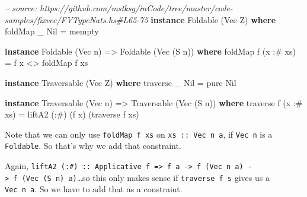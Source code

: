\documentclass[]{article}
\newenvironment{Shaded}{}{}
\newcommand{\KeywordTok}[1]{\textcolor[rgb]{0.00,0.44,0.13}{\textbf{{#1}}}}
\newcommand{\DataTypeTok}[1]{\textcolor[rgb]{0.56,0.13,0.00}{{#1}}}
\newcommand{\CommentTok}[1]{\textcolor[rgb]{0.38,0.63,0.69}{\textit{{#1}}}}
\newcommand{\OtherTok}[1]{\textcolor[rgb]{0.00,0.44,0.13}{{#1}}}
\newcommand{\FunctionTok}[1]{\textcolor[rgb]{0.02,0.16,0.49}{{#1}}}
\newcommand{\NormalTok}[1]{{#1}}
\begin{document}
\begin{Shaded}
\begin{Highlighting}[]
\CommentTok{-- source: https://github.com/mstksg/inCode/tree/master/code-samples/fixvec/FVTypeNats.hs#L65-75}
\KeywordTok{instance} \DataTypeTok{Foldable} \NormalTok{(}\DataTypeTok{Vec} \DataTypeTok{Z}\NormalTok{) }\KeywordTok{where}
    \NormalTok{foldMap _ }\DataTypeTok{Nil} \FunctionTok{=} \NormalTok{mempty}

\KeywordTok{instance} \DataTypeTok{Foldable} \NormalTok{(}\DataTypeTok{Vec} \NormalTok{n) }\OtherTok{=>} \DataTypeTok{Foldable} \NormalTok{(}\DataTypeTok{Vec} \NormalTok{(}\DataTypeTok{S} \NormalTok{n)) }\KeywordTok{where}
    \NormalTok{foldMap f (x }\FunctionTok{:#} \NormalTok{xs) }\FunctionTok{=} \NormalTok{f x }\FunctionTok{<>} \NormalTok{foldMap f xs}

\KeywordTok{instance} \DataTypeTok{Traversable} \NormalTok{(}\DataTypeTok{Vec} \DataTypeTok{Z}\NormalTok{) }\KeywordTok{where}
    \NormalTok{traverse _ }\DataTypeTok{Nil} \FunctionTok{=} \NormalTok{pure }\DataTypeTok{Nil}

\KeywordTok{instance} \DataTypeTok{Traversable} \NormalTok{(}\DataTypeTok{Vec} \NormalTok{n) }\OtherTok{=>} \DataTypeTok{Traversable} \NormalTok{(}\DataTypeTok{Vec} \NormalTok{(}\DataTypeTok{S} \NormalTok{n)) }\KeywordTok{where}
    \NormalTok{traverse f (x }\FunctionTok{:#} \NormalTok{xs) }\FunctionTok{=} \NormalTok{liftA2 (}\FunctionTok{:#}\NormalTok{) (f x) (traverse f xs)}
\end{Highlighting}
\end{Shaded}

Note that we can only use \texttt{foldMap\ f\ xs} on \texttt{xs\ ::\ Vec\ n\ a},
if \texttt{Vec\ n} is a \texttt{Foldable}. So that's why we add that constraint.

Again,
\texttt{liftA2\ (:\#)\ ::\ Applicative\ f\ =\textgreater{}\ f\ a\ -\textgreater{}\ f\ (Vec\ n\ a)\ -\textgreater{}\ f\ (Vec\ (S\ n)\ a)}\ldots{}so
this only makes sense if \texttt{traverse\ f\ s} gives us a \texttt{Vec\ n\ a}.
So we have to add that as a constraint.
\end{document}
